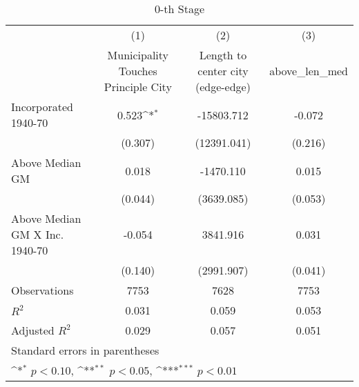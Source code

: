 \begin{table}[htbp]\centering
\def\sym#1{\ifmmode^{#1}\else\(^{#1}\)\fi}
\caption{0-th Stage}
\begin{tabular}{l*{3}{c}}
\hline\hline
                    &\multicolumn{1}{c}{(1)}&\multicolumn{1}{c}{(2)}&\multicolumn{1}{c}{(3)}\\
                    &\multicolumn{1}{c}{Municipality Touches Principle City}&\multicolumn{1}{c}{Length to center city (edge-edge)}&\multicolumn{1}{c}{above\_len\_med}\\
\hline
Incorporated 1940-70&       0.523\sym{*}  &  -15803.712         &      -0.072         \\
                    &     (0.307)         & (12391.041)         &     (0.216)         \\
[1em]
Above Median GM     &       0.018         &   -1470.110         &       0.015         \\
                    &     (0.044)         &  (3639.085)         &     (0.053)         \\
[1em]
Above Median GM X Inc. 1940-70&      -0.054         &    3841.916         &       0.031         \\
                    &     (0.140)         &  (2991.907)         &     (0.041)         \\
\hline
Observations        &        7753         &        7628         &        7753         \\
\(R^{2}\)           &       0.031         &       0.059         &       0.053         \\
Adjusted \(R^{2}\)  &       0.029         &       0.057         &       0.051         \\
\hline\hline
\multicolumn{4}{l}{\footnotesize Standard errors in parentheses}\\
\multicolumn{4}{l}{\footnotesize \sym{*} \(p<0.10\), \sym{**} \(p<0.05\), \sym{***} \(p<0.01\)}\\
\end{tabular}
\end{table}

